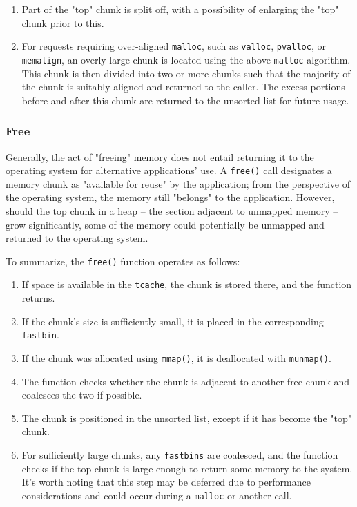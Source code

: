 \documentclass{article}
\begin{document}
\begin{enumerate}
\item Part of the "top" chunk is split off, with a possibility of enlarging the
"top" chunk prior to this.

\item For requests requiring over-aligned \texttt{malloc}, such as
\texttt{valloc}, \texttt{pvalloc}, or \texttt{memalign}, an overly-large chunk
is located using the above \texttt{malloc} algorithm. This chunk is then divided
into two or more chunks such that the majority of the chunk is suitably aligned
and returned to the caller. The excess portions before and after this chunk are
returned to the unsorted list for future usage.
\end{enumerate}

\subsubsection{Free} Generally, the act of "freeing" memory does not entail
returning it to the operating system for alternative applications' use. A
\texttt{free()} call designates a memory chunk as "available for reuse" by the
application; from the perspective of the operating system, the memory still
"belongs" to the application. However, should the top chunk in a heap -- the
section adjacent to unmapped memory -- grow significantly, some of the memory
could potentially be unmapped and returned to the operating system.

To summarize, the \texttt{free()} function operates as follows:

\begin{enumerate}
\item If space is available in the \texttt{tcache}, the chunk is stored there,
and the function returns.

\item If the chunk's size is sufficiently small, it is placed in the
corresponding \texttt{fastbin}.

\item If the chunk was allocated using \texttt{mmap()}, it is deallocated with
\texttt{munmap()}.

\item The function checks whether the chunk is adjacent to another free chunk
and coalesces the two if possible.

\item The chunk is positioned in the unsorted list, except if it has become the
"top" chunk.

\item For sufficiently large chunks, any \texttt{fastbins} are coalesced, and
the function checks if the top chunk is large enough to return some memory to
the system. It's worth noting that this step may be deferred due to performance
considerations and could occur during a \texttt{malloc} or another call.
\end{enumerate}
\end{document}
